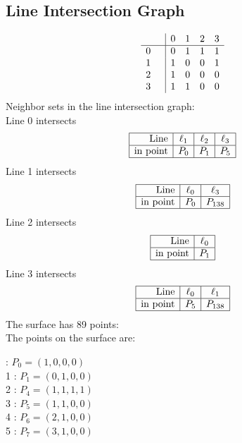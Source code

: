 \documentclass{article}
\begin{document}
{\subsection*{Line Intersection Graph}
{\arraycolsep=1pt
$$
\begin{array}{rr|*{4}r}
 &  & 0 & 1 & 2 & 3\\
\hline
0 &  & 0 & 1 & 1 & 1\\
1 &  & 1 & 0 & 0 & 1\\
2 &  & 1 & 0 & 0 & 0\\
3 &  & 1 & 1 & 0 & 0\\
\end{array}
$$
}%
Neighbor sets in the line intersection graph:\\
Line 0 intersects 
$$
\begin{array}{|r*{3}{|c}|}
\hline
\mbox{Line}  & \ell_{1} & \ell_{2} & \ell_{3}\\
\hline
\mbox{in point}  & P_{0} & P_{1} & P_{5}\\
\hline
\end{array}
$$
Line 1 intersects 
$$
\begin{array}{|r*{2}{|c}|}
\hline
\mbox{Line}  & \ell_{0} & \ell_{3}\\
\hline
\mbox{in point}  & P_{0} & P_{138}\\
\hline
\end{array}
$$
Line 2 intersects 
$$
\begin{array}{|r*{1}{|c}|}
\hline
\mbox{Line}  & \ell_{0}\\
\hline
\mbox{in point}  & P_{1}\\
\hline
\end{array}
$$
Line 3 intersects 
$$
\begin{array}{|r*{2}{|c}|}
\hline
\mbox{Line}  & \ell_{0} & \ell_{1}\\
\hline
\mbox{in point}  & P_{5} & P_{138}\\
\hline
\end{array}
$$
The surface has 89 points:\\
The points on the surface are:\\
\begin{multicols}{3}
 : $P_{0}=( 1, 0, 0, 0 )$\\
1 : $P_{1}=( 0, 1, 0, 0 )$\\
2 : $P_{4}=( 1, 1, 1, 1 )$\\
3 : $P_{5}=( 1, 1, 0, 0 )$\\
4 : $P_{6}=( 2, 1, 0, 0 )$\\
5 : $P_{7}=( 3, 1, 0, 0 )$\\

\end{multicols}}
\end{document}
